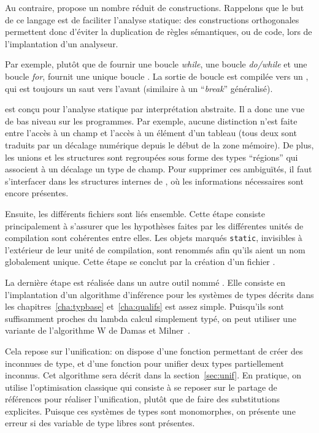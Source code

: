 Au contraire, \newspeak propose un nombre réduit de constructions. Rappelons que
le but de ce langage est de faciliter l'analyse statique: des constructions
orthogonales permettent donc d'éviter la duplication de règles sémantiques, ou
de code, lors de l'implantation d'un analyseur.

Par exemple, plutôt que de fournir une boucle \emph{while}, une boucle
\emph{do/while} et une boucle \emph{for}, \newspeak fournit une unique boucle
\phx\npkWhile. La sortie de boucle est compilée vers un \npkGoto{}\cite{goto},
qui est toujours un saut vers l'avant (similaire à un \enquote{\emph{break}}
généralisé).

\newspeak est conçu pour l'analyse statique par interprétation abstraite. Il a
donc une vue de bas niveau sur les programmes. Par exemple, aucune distinction
n'est faite entre l'accès à un champ et l'accès à un élément d'un tableau (tous
deux sont traduits par un décalage numérique depuis le début de la zone
mémoire). De plus, les unions et les structures sont regroupées sous forme des
types \enquote{régions} qui associent à un décalage un type de champ. Pour
supprimer ces ambiguïtés, il faut s'interfacer dans les structures internes de
\ctonewspeak, où les informations nécessaires sont encore présentes.

Ensuite, les différents fichiers sont liés ensemble. Cette étape consiste
principalement à s'assurer que les hypothèses faites par les différentes unités
de compilation sont cohérentes entre elles. Les objets marqués \texttt{static},
invisibles à l'extérieur de leur unité de compilation, sont renommés afin qu'ils
aient un nom globalement unique. Cette étape se conclut par la création d'un
fichier \newspeak.

La dernière étape est réalisée dans un autre outil nommé \ptrtype. Elle consiste
en l'implantation d'un algorithme d'inférence pour les systèmes de types décrits
dans les chapitres~\ref{cha:typbase} et~\ref{cha:qualifs} est assez simple.
Puisqu'ils sont suffisamment proches du lambda calcul simplement typé, on peut
utiliser une variante de l'algorithme W de Damas et Milner~\cite{DamasMilner}.

Cela repose sur l'unification: on dispose d'une fonction permettant de créer des
inconnues de type, et d'une fonction pour unifier deux types partiellement
inconnus. Cet algorithme sera décrit dans la section~\ref{sec:unif}. En
pratique, on utilise l'optimisation classique qui consiste à se
reposer sur le partage de références pour réaliser l'unification, plutôt que de
faire des substitutions explicites. Puisque ces systèmes de types sont
monomorphes, on présente une erreur si des variable de type libres sont
présentes.

